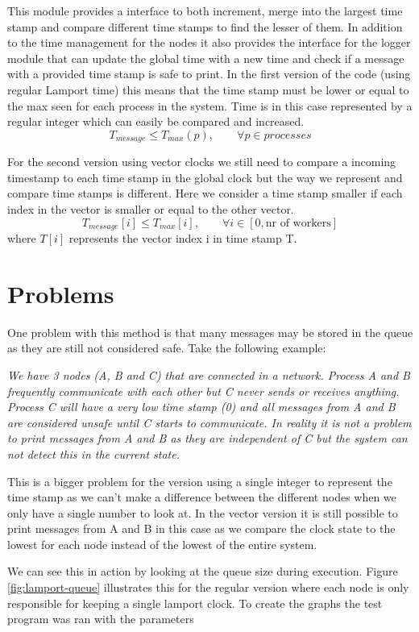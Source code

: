 This module provides a interface to both increment, merge into the largest time stamp and compare different time stamps to find the lesser of them. In addition to the time management for the nodes it also provides the interface for the logger module that can update the global time with a new time and check if a message with a provided time stamp is safe to print. In the first version of the code (using regular Lamport time) this means that the time stamp must be lower or equal to the max seen for each process in the system. Time is in this case represented by a regular integer which can easily be compared and increased.
\[ T_{message} \leq T_{max}(p), \qquad \forall p \in processes \]

For the second version using vector clocks we still need to compare a incoming timestamp to each time stamp in the global clock but the way we represent and compare time stamps is different. Here we consider a time stamp smaller if each index in the vector is smaller or equal to the other vector.
\[ T_{message}[i] \leq T_{max}[i], \qquad \forall i \in [0, \text{nr of workers} ] \]
where $ T[i] $ represents the vector index i in time stamp T.

\section{Problems}
One problem with this method is that many messages may be stored in the queue as they are still not considered safe. Take the following example:

\textit{
	We have 3 nodes (A, B and C) that are connected in a network. Process A and B frequently communicate with each other but C never sends or receives anything. Process C will have a very low time stamp (0) and all messages from A and B are considered unsafe until C starts to communicate. In reality it is not a problem to print messages from A and B as they are independent of C but the system can not detect this in the current state.
}

This is a bigger problem for the version using a single integer to represent the time stamp as we can't make a difference between the different nodes when we only have a single number to look at. In the vector version it is still possible to print messages from A and B in this case as we compare the clock state to the lowest for each node instead of the lowest of the entire system.

We can see this in action by looking at the queue size during execution. Figure \ref{fig:lamport-queue} illustrates this for the regular version where each node is only responsible for keeping a single lamport clock. To create the graphs the test program was ran with the parameters


